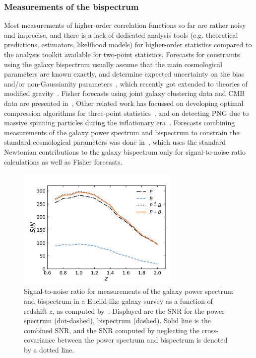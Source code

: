 \subsubsection{Measurements of the bispectrum}

Most measurements of higher-order correlation functions so far are rather noisy and imprecise, and there is a lack of dedicated analysis tools (e.g. theoretical predictions, estimators, likelihood models) for higher-order statistics compared to the analysis toolkit available for two-point statistics. Forecasts for constraints using the galaxy bispectrum usually assume that the main cosmological parameters are known exactly, and determine expected uncertainty on the bias and/or non-Gaussianity parameters~\cite{Scoccimarro:2003wn,Sefusatti:2007ih,Song:2015gca,Tellarini:2016sgp,Yamauchi:2016wuc,Karagiannis:2018jdt}, which recently got extended to theories of modified gravity~\cite{Yamauchi:2017ibz}. Fisher forecasts using joint galaxy clustering data and CMB data are presented in~\cite{Sefusatti:2006pa}, Other related work has focussed on developing optimal compression algorithms for three-point statistics~\cite{Byun:2017fkz,Gualdi:2018pyw}, and on detecting PNG due to massive spinning particles during the inflationary era~\cite{MoradinezhadDizgah:2018ssw}. Forecasts combining measurements of the galaxy power spectrum and bispectrum to constrain the standard cosmological parameters was done in~\cite{Yankelevich:2018uaz}, which uses the standard Newtonian contributions to the galaxy bispectrum only for signal-to-noise ratio calculations as well as Fisher forecasts. 

\begin{figure}[!ht]
	\centering
	\includegraphics[width=0.7\textwidth]{fig/ypsnr.png}
	\caption{Signal-to-noise ratio for measurements of the galaxy power spectrum and bispectrum in a Euclid-like galaxy survey as a function of redshift $z$, as computed by~\cite{Yankelevich:2018uaz}. Displayed are the SNR for the power spectrum (dot-dashed), bispectrum (dashed). Solid line is the combined SNR, and the SNR computed by neglecting the cross-covariance between the power spectrum and bispectrum is denoted by a dotted line.}
\end{figure}

